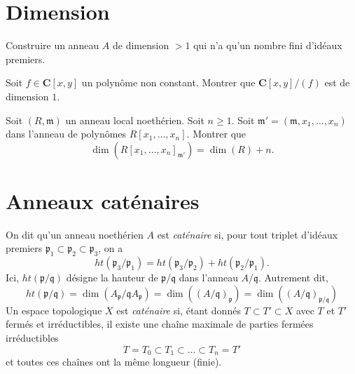 \section{Dimension}
\label{section-dimension}

\begin{exercise}
\label{exercise-dimension-bigger-one-finite-nr-primes}
Construire un anneau $A$ de dimension $> 1$ qui n'a qu'un nombre fini d'idéaux premiers.
\end{exercise}

\begin{exercise}
\label{exercise-hypersurface-in-A2-dimension-one}
Soit $f \in \mathbf{C}[x, y]$ un polynôme non constant.
Montrer que $\mathbf{C}[x, y]/(f)$ est de dimension $1$.
\end{exercise}

\begin{exercise}
\label{exercise-dimension-polynomial-ring}
Soit $(R, \mathfrak m)$ un anneau local noethérien.
Soit $n \geq 1$. Soit $\mathfrak m' = (\mathfrak m, x_1, \ldots, x_n)$
dans l'anneau de polynômes $R[x_1, \ldots, x_n]$.
Montrer que
$$
\dim(R[x_1, \ldots, x_n]_{\mathfrak m'}) = \dim(R) + n.
$$
\end{exercise}





\section{Anneaux caténaires}
\label{section-catenary}

\begin{definition}
\label{definition-catenary}
On dit qu'un anneau noethérien $A$ est {\it caténaire}
si, pour tout triplet d'idéaux premiers
${\mathfrak p}_1 \subset {\mathfrak p}_2 \subset {\mathfrak p}_3$,
on a
$$
ht({\mathfrak p}_3 / {\mathfrak p}_1) = ht({\mathfrak p}_3/{\mathfrak p}_2) +
ht({\mathfrak p}_2/{\mathfrak p}_1).
$$
Ici, $ht(\mathfrak p/\mathfrak q)$ désigne la hauteur de
$\mathfrak p/\mathfrak q$ dans l'anneau $A/\mathfrak q$.
Autrement dit,
$$
ht(\mathfrak p/\mathfrak q) =
\dim(A_\mathfrak p/\mathfrak qA_\mathfrak p) =
\dim((A/\mathfrak q)_\mathfrak p) =
\dim((A/\mathfrak q)_{\mathfrak p/\mathfrak q})
$$
Un espace topologique $X$ est {\it caténaire} si, étant donnés $T \subset T' \subset X$
avec $T$ et $T'$ fermés et irréductibles, il existe une chaîne maximale
de parties fermées irréductibles
$$
T = T_0 \subset T_1 \subset \ldots \subset T_n = T'
$$
et toutes ces chaînes ont la même longueur (finie).
\end{definition}

